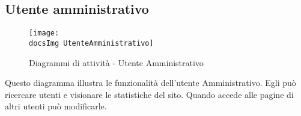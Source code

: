 {	\subsection{Utente amministrativo}{
		\begin{figure}[H]
			\centering
			\texttt{[image: \\docsImg UtenteAmministrativo]}
			\caption{Diagrammi di attività - Utente Amministrativo}
		\end{figure}
			Questo diagramma illustra le funzionalità dell'utente Amministrativo. Egli può ricercare utenti e visionare le statistiche del sito. Quando accede alle pagine di altri utenti può modificarle. 
	}
}